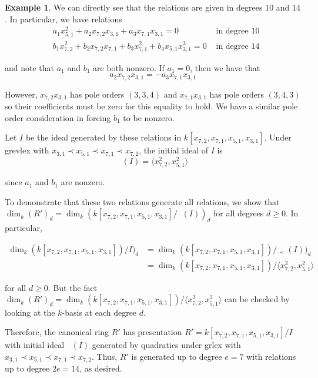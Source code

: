 \documentclass{amsart}
\theoremstyle{plain}
\theoremstyle{definition}
\newtheorem{example}[thm]{Example}
\theoremstyle{remark}
\numberwithin{equation}{section}
\DeclareMathOperator{\initial}{in_\prec}
\begin{document}
\begin{example}

We can directly see that the relations are given in degrees $10$
and $14$. In particular, we have relations
\begin{align*}
	&a_1 x_{5, 1}^2 + a_2 x_{7, 2} x_{3, 1} + a_3 x_{7, 1} x_{3, 1} = 
	0 &\text{ in degree $10$} \\
	&b_1 x_{7, 2}^2 + b_2 x_{7, 2} x_{7, 1} + b_3 x_{7, 1}^2
	+ b_4 x_{5, 1} x_{3, 1}^3 = 0  &\text{ in degree $14$}
\end{align*}

\noindent
and note that $a_1$ and $b_1$ are both nonzero. If $a_1 = 0$, then we
have that
\[
	a_2 x_{7, 2} x_{3, 1} = -a_3 x_{7, 1} x_{3, 1}
\]

\noindent
However, $x_{7, 2} x_{3, 1}$ has pole orders $(3, 3, 4)$ and
$x_{7, 1} x_{3, 1}$ has pole orders $(3, 4, 3)$ so their
coefficients must be zero for this equality to hold. We have a
similar pole order consideration in forcing $b_1$ to be nonzero.

Let $I$ be the ideal generated by these relations in
$k[x_{7, 2}, x_{7, 1}, x_{5, 1}, x_{3, 1}]$. Under grevlex with
$x_{3,1} \prec x_{5,1} \prec x_{7,1} \prec x_{7,2}$, the initial
ideal of $I$ is
\[
	\initial(I) = \langle x_{7, 2}^2, x_{5, 1}^2 \rangle
\]

\noindent
since $a_1$ and $b_1$ are nonzero.

To demonstrate that these two relations generate all 
relations, we show that $\dim_k (R')_d = \dim_k
(k[x_{7, 2}, x_{7, 1}, x_{5, 1}, x_{3, 1}] / \initial(I))_d$ for 
all degrees $d \geq 0$. In particular, 

\begin{align*}
	\dim_k (k[x_{7, 2}, x_{7, 1}, x_{5, 1}, x_{3, 1}]) / I)_d &=
	\dim_k (k[x_{7, 2}, x_{7, 1}, x_{5, 1}, x_{3, 1}])	/ \initial_\prec(I))_d \\
	&= \dim_k (k[x_{7, 2}, x_{7, 1}, x_{5, 1}, x_{3, 1}]) / \langle
	x_{7, 2}^2, x_{5, 1}^2 \rangle
\end{align*}

\noindent
for all $d \geq 0$. But the fact $\dim_k (R')_d = \dim_k (k[x_{7, 2},
x_{7, 1}, x_{5, 1}, x_{3, 1}]) / \langle x_{7, 2}^2, x_{5, 1}^2
\rangle$ can be checked by looking at the $k$-basis at each degree
$d$.

Therefore, the canonical ring $R'$ has presentation $R' =
k[x_{7, 2}, x_{7, 1}, x_{5, 1}, x_{3, 1}] / I$ with
initial ideal $\initial(I)$ generated by quadratics under grlex
with $x_{3,1} \prec x_{5,1} \prec x_{7,1} \prec x_{7,2}$.
Thus, $R'$ is generated up to degree $e = 7$ with relations up to
degree $2e = 14$, as desired.

\end{example}
\end{document}
